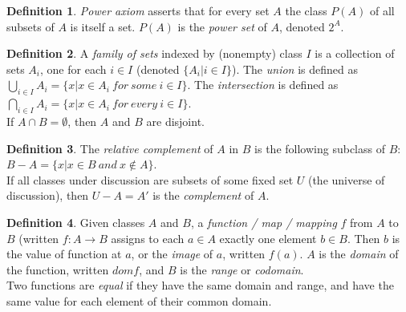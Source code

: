 \documentclass[a4paper,sfsidenotes,openany]{tufte-book}
\theoremstyle{definition}
\newtheorem{definition}{Definition}[section]
\begin{document}
\begin{fullwidth}
\begin{definition}
\textit{{\color{blue} Power axiom}} asserts that for every set $ A $ the class $ P(A) $ of all subsets of $ A $ is itself a set. $ P(A) $ is the \textit{{\color{blue} power set}} of $ A $, denoted $ 2^A $.\\
\end{definition}
\>

\begin{definition}
A \textit{{\color{blue} family of sets}} indexed by (nonempty) class $ I $ is a collection of sets $ A_i $, one for each $ i \in I $ (denoted $\{ A_i | i \in I \}$).\newline
The \textit{{\color{blue} union}} is defined as $ \bigcup\limits_{i \in I}A_{i} = \{ x | x \in A_i \ for \ some \ i \in I \}$.\newline
The \textit{{\color{blue} intersection}} is defined as $ \bigcap\limits_{i \in I}A_{i} = \{ x | x \in A_i \ for \ every \ i \in I \}$.\\
If $ A \cap B = \emptyset $, then $ A $ and $ B $ are disjoint.\\
\end{definition}
\>

\begin{definition}
The \textit{{\color{blue} relative complement}} of $ A $ in $ B $ is the following subclass of $ B $: $ B-A = \{ x | x \in B \ and \ x \notin A \}$. \\
If all classes under discussion are subsets of some fixed set $ U $ (the universe of discussion), then $ U - A = A' $ is the \textit{{\color{blue} complement}} of $ A $.\\
\end{definition}
\>

\begin{definition}
Given classes $ A $ and $ B $, a \textit{{\color{blue} function / map / mapping}} $ f $ from $ A $ to $ B $ (written $ f: A \rightarrow B $ assigns to each $ a \in A $ exactly one element $ b \in B $.\newline
Then $ b $ is the value of function at $ a $, or the \textit{{\color{blue} image}} of $ a $, written $ f(a) $.\newline
$ A $ is the \textit{{\color{blue} domain}} of the function, written $ dom f $, and $ B $ is the \textit{{\color{blue} range}} or \textit{{\color{blue} codomain}}.\\
Two functions are \textit{{\color{blue} equal}} if they have the same domain and range, and have the same value for each element of their common domain.\\
\end{definition}
\>


\end{fullwidth}
\end{document}
